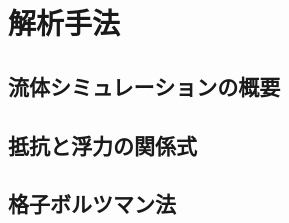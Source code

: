 \documentclass[main]{subfiles}
\begin{document}
\chapter{解析手法}

\section{流体シミュレーションの概要}


\section{抵抗と浮力の関係式}


\section{格子ボルツマン法}

\end{document}
